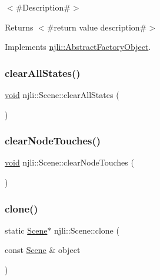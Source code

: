 $<$\#\+Description\#$>$

\begin{DoxyReturn}{Returns}
$<$\#return value description\#$>$ 
\end{DoxyReturn}


Implements \mbox{\hyperlink{classnjli_1_1_abstract_factory_object_a4763d05bc9dc37c559111f8bb30e1dd8}{njli\+::\+Abstract\+Factory\+Object}}.

\mbox{\label{classnjli_1_1_scene_a7a3b03d4a7537c7716f88ba8e10af13a}} 
\subsubsection{\texorpdfstring{clear\+All\+States()}{clearAllStates()}}
{\footnotesize\ttfamily \mbox{\hyperlink{_thread_8h_af1e856da2e658414cb2456cb6f7ebc66}{void}} njli\+::\+Scene\+::clear\+All\+States (\begin{DoxyParamCaption}{ }\end{DoxyParamCaption})\hspace{0.3cm}{\ttfamily [protected]}}

\mbox{\label{classnjli_1_1_scene_ad8f34eff6d8d4fff8c293936b316f4b9}} 
\subsubsection{\texorpdfstring{clear\+Node\+Touches()}{clearNodeTouches()}}
{\footnotesize\ttfamily \mbox{\hyperlink{_thread_8h_af1e856da2e658414cb2456cb6f7ebc66}{void}} njli\+::\+Scene\+::clear\+Node\+Touches (\begin{DoxyParamCaption}{ }\end{DoxyParamCaption})\hspace{0.3cm}{\ttfamily [protected]}}

\mbox{\label{classnjli_1_1_scene_ad3630f0e75efb992b123c89654607040}} 
\subsubsection{\texorpdfstring{clone()}{clone()}}
{\footnotesize\ttfamily static \mbox{\hyperlink{classnjli_1_1_scene}{Scene}}$\ast$ njli\+::\+Scene\+::clone (\begin{DoxyParamCaption}\item[{const \mbox{\hyperlink{classnjli_1_1_scene}{Scene}} \&}]{object }\end{DoxyParamCaption})\hspace{0.3cm}{\ttfamily [static]}}

